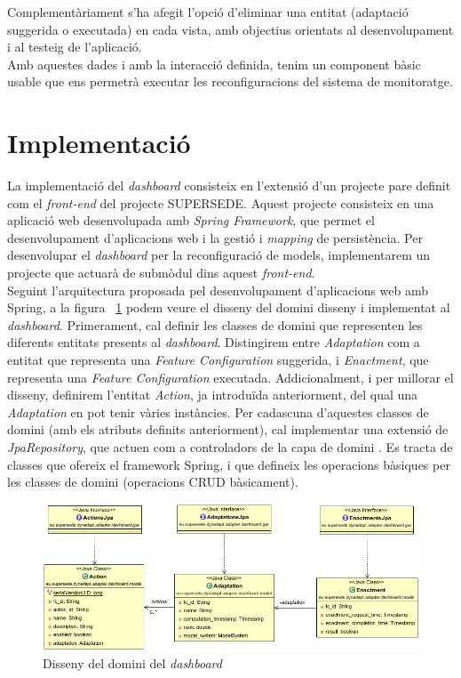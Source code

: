 Complementàriament s'ha afegit l'opció d'eliminar una entitat (adaptació suggerida o executada) en cada vista, amb objectius orientats al desenvolupament i al testeig de l'aplicació.\\

Amb aquestes dades i amb la interacció definida, tenim un component bàsic usable que ens permetrà executar les reconfiguracions del sistema de monitoratge.

\section{Implementació}

La implementació del \textit{dashboard} consisteix en l'extensió d'un projecte pare definit com el \textit{front-end} del projecte SUPERSEDE. Aquest projecte consisteix en una aplicació web desenvolupada amb \textit{Spring Framework}, que permet el desenvolupament d'aplicacions web i la gestió i \textit{mapping} de persistència. Per desenvolupar el \textit{dashboard} per la reconfiguració de models, implementarem un projecte que actuarà de submòdul dins aquest \textit{front-end}.\\

Seguint l'arquitectura proposada pel desenvolupament d'aplicacions web amb Spring, a la figura ~\ref{fig:Figura34} podem veure el disseny del domini disseny i implementat al \textit{dashboard}. Primerament, cal definir les classes de domini que representen les diferents entitats presents al \textit{dashboard}. Distingirem entre \textit{Adaptation} com a entitat que representa una \textit{Feature Configuration} suggerida, i \textit{Enactment}, que representa una \textit{Feature Configuration} executada. Addicionalment, i per millorar el disseny, definirem l'entitat \textit{Action}, ja introduïda anteriorment, del qual una \textit{Adaptation} en pot tenir vàries instàncies. Per cadascuna d'aquestes classes de domini (amb els atributs definits anteriorment), cal implementar una extensió de \textit{JpaRepository}, que actuen com a controladors de la capa de domini \cite{jpa}. Es tracta de classes que ofereix el framework Spring, i que defineix les operacions bàsiques per les classes de domini (operacions CRUD bàsicament).\\

\begin{figure}
\centering
\includegraphics[width=14cm]{Figures/Figure34}
\decoRule
\caption{Disseny del domini del \textit{dashboard}}
\label{fig:Figura34}
\end{figure} 


